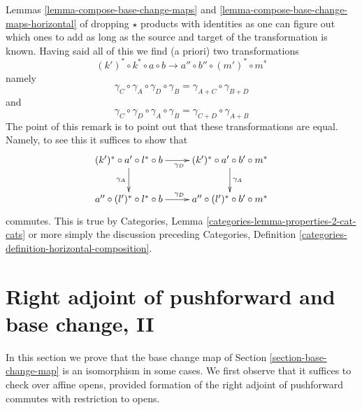 \begin{remark}
Lemmas \ref{lemma-compose-base-change-maps} and
\ref{lemma-compose-base-change-maps-horizontal}
of dropping $\star$ products with identities as one can figure
out which ones to add as long as the source and target of the
transformation is known.
Having said all of this we find (a priori) two transformations
$$
(k')^* \circ k^* \circ a \circ b
\longrightarrow
a'' \circ b'' \circ (m')^* \circ m^*
$$
namely
$$
\gamma_C \circ \gamma_A \circ \gamma_D \circ \gamma_B =
\gamma_{A + C} \circ \gamma_{B + D}
$$
and
$$
\gamma_C \circ \gamma_D \circ \gamma_A \circ \gamma_B =
\gamma_{C + D} \circ \gamma_{A + B}
$$
The point of this remark is to point out that these transformations
are equal. Namely, to see this it suffices to show that
$$
\xymatrix{
(k')^* \circ a' \circ l^* \circ b \ar[r]_{\gamma_D} \ar[d]_{\gamma_A} &
(k')^* \circ a' \circ b' \circ m^* \ar[d]^{\gamma_A} \\
a'' \circ (l')^* \circ l^* \circ b \ar[r]^{\gamma_D} &
a'' \circ (l')^* \circ b' \circ m^*
}
$$
commutes. This is true by
Categories, Lemma \ref{categories-lemma-properties-2-cat-cats}
or more simply the discussion preceding
Categories, Definition \ref{categories-definition-horizontal-composition}.
\end{remark}







\section{Right adjoint of pushforward and base change, II}
\label{section-base-change-II}

\noindent
In this section we prove that the base change map of
Section \ref{section-base-change-map} is an isomorphism
in some cases. We first observe that it suffices to check
over affine opens, provided formation of the right adjoint
of pushforward commutes with restriction to opens.

